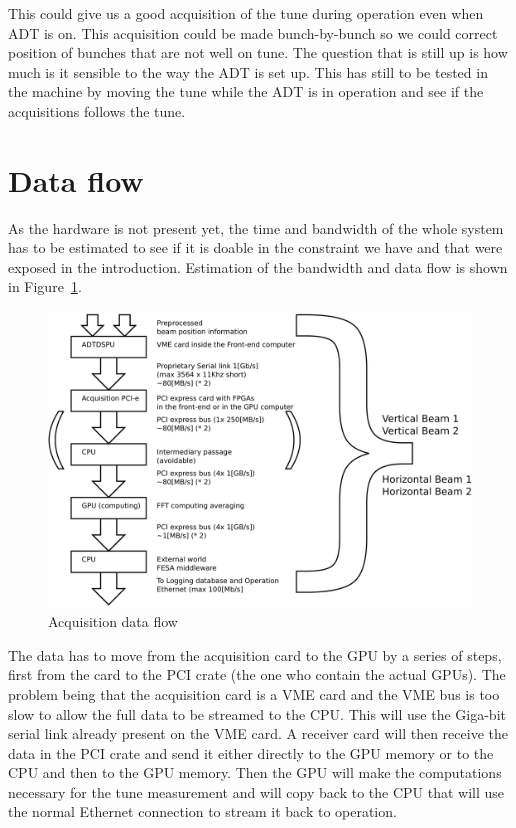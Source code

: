 This could give us a good acquisition of the tune during operation even when \gls{ADT} is on. This acquisition could be made bunch-by-bunch so we could correct position of bunches that are not well on tune. The question that is still up is how much is it sensible to the way the \gls{ADT} is set up. This has still to be tested in the machine by moving the tune while the \gls{ADT} is in operation and see if the acquisitions follows the tune.

\section{Data flow}

As the hardware is not present yet, the time and bandwidth of the whole system has to be estimated to see if it is doable in the constraint we have and that were exposed in the introduction. Estimation of the bandwidth and data flow is shown in Figure~\ref{fig:data_flow}.

\begin{figure}[H]
\caption{Acquisition data flow}
\label{fig:data_flow}
\centering
\includegraphics[scale=0.3]{dataflow.pdf}
\end{figure}

The data has to move from the acquisition card to the GPU by a series of steps, first from the card to the PCI crate (the one who contain the actual \glspl{GPU}). The problem being that the acquisition card is a \gls{VME} card and the VME bus is too slow to allow the full data to be streamed to the CPU. This will use the Giga-bit serial link already present on the VME card. A receiver card will then receive the data in the PCI crate and send it either directly to the \gls{GPU} memory or to the \gls{CPU} and then to the \gls{GPU} memory. Then the \gls{GPU} will make the computations necessary for the tune measurement and will copy back to the \gls{CPU} that will use the normal Ethernet connection to stream it back to operation.

